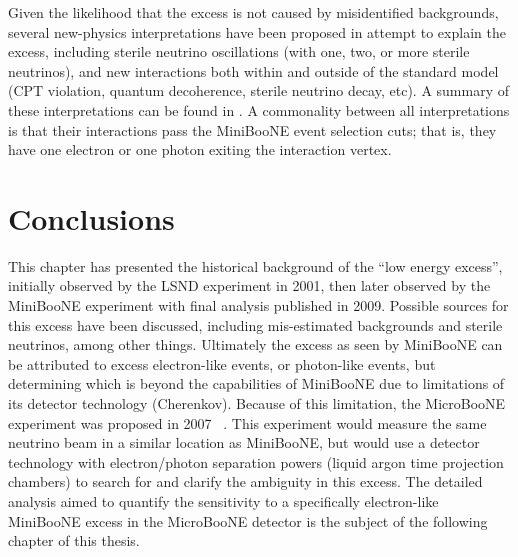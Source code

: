 Given the likelihood that the excess is not caused by misidentified backgrounds, several new-physics interpretations have been proposed in attempt to explain the excess, including sterile neutrino oscillations (with one, two, or more sterile neutrinos), and new interactions both within and outside of the standard model (CPT violation, quantum decoherence, sterile neutrino decay, etc). A summary of these interpretations can be found in \cite{MBLEESourcesOverview}. A commonality between all interpretations is that their interactions pass the MiniBooNE event selection cuts; that is, they have one electron or one photon exiting the interaction vertex.\\

\section{Conclusions}
This chapter has presented the historical background of the ``low energy excess'', initially observed by the LSND experiment in 2001, then later observed by the MiniBooNE experiment with final analysis published in 2009. Possible sources for this excess have been discussed, including mis-estimated backgrounds and sterile neutrinos, among other things. Ultimately the excess as seen by MiniBooNE can be attributed to excess electron-like events, or photon-like events, but determining which is beyond the capabilities of MiniBooNE due to limitations of its detector technology (Cherenkov). Because of this limitation, the MicroBooNE experiment was proposed in 2007 ~\cite{MicroBooNEProposal}. This experiment would measure the same neutrino beam in a similar location as MiniBooNE, but would use a detector technology with electron/photon separation powers (liquid argon time projection chambers) to search for and clarify the ambiguity in this excess. The detailed analysis aimed to quantify the sensitivity to a specifically electron-like MiniBooNE excess in the MicroBooNE detector is the subject of the following chapter of this thesis.
